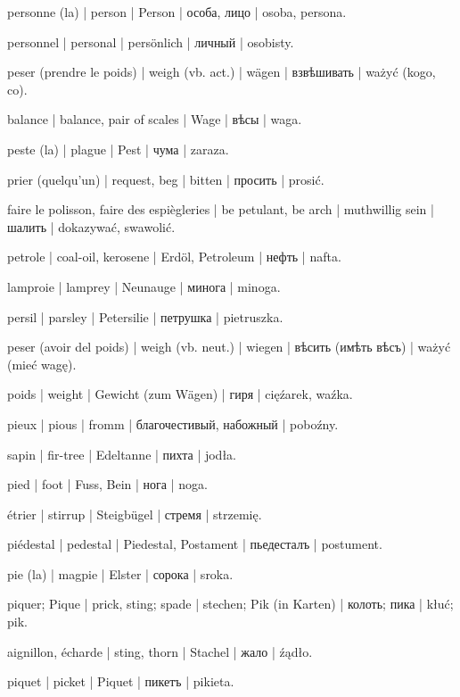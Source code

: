 \begin{outdent}{1em}
personne (la) | person | Person | особа, лицо | osoba, persona.

\uvsubentry{}
personnel | personal | persönlich | личный | osobisty.

peser (prendre le poids) | weigh (vb. act.) | wägen | взвѣшивать | ważyć (kogo, co).

\uvsubentry{}
balance | balance, pair of scales | Wage | вѣсы | waga.

peste (la) | plague | Pest | чума | zaraza.

prier (quelqu’un) | request, beg | bitten | просить | prosić.

faire le polisson, faire des espiègleries | be petulant, be
arch | muthwillig sein | шалить | dokazywać, swawolić.

petrole | coal-oil, kerosene | Erdöl, Petroleum | нефть | nafta.

lamproie | lamprey | Neunauge | минога | minoga.

persil | parsley | Petersilie | петрушка | pietruszka.

peser (avoir del poids) | weigh (vb. neut.) | wiegen | вѣсить
(имѣть вѣсъ) | ważyć (mieć wagę).

\uvsubentry{}
poids | weight | Gewicht (zum Wägen) | гиря | cięźarek, waźka.

pieux | pious | fromm | благочестивый, набожный | poboźny.

sapin | fir-tree | Edeltanne | пихта | jodła.

pied | foot | Fuss, Bein | нога | noga.

\uvsubentry{}
étrier | stirrup | Steigbügel | стремя | strzemię.


\uvsubentry{}
piédestal | pedestal | Piedestal, Postament | пьедесталъ | postument.

pie (la) | magpie | Elster | сорока | sroka.

piquer; Pique | prick, sting; spade | stechen; Pik (in Karten) | колоть; пика | kłuć; pik.

\uvsubentry{}
aignillon, écharde | sting, thorn | Stachel | жало | źądło.

piquet | picket | Piquet | пикетъ | pikieta.


\end{outdent}

